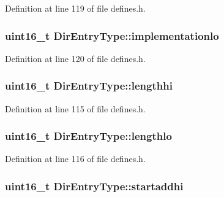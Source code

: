Definition at line 119 of file defines.\+h.

\subsubsection[{\texorpdfstring{implementationlo}{implementationlo}}]{\setlength{\rightskip}{0pt plus 5cm}uint16\+\_\+t Dir\+Entry\+Type\+::implementationlo}\hypertarget{structDirEntryType_a8164d577c06fb7c312aaa4955d491449}{}\label{structDirEntryType_a8164d577c06fb7c312aaa4955d491449}


Definition at line 120 of file defines.\+h.

\subsubsection[{\texorpdfstring{lengthhi}{lengthhi}}]{\setlength{\rightskip}{0pt plus 5cm}uint16\+\_\+t Dir\+Entry\+Type\+::lengthhi}\hypertarget{structDirEntryType_ad7aaba7b01038bc8bacb096bd66fff08}{}\label{structDirEntryType_ad7aaba7b01038bc8bacb096bd66fff08}


Definition at line 115 of file defines.\+h.

\subsubsection[{\texorpdfstring{lengthlo}{lengthlo}}]{\setlength{\rightskip}{0pt plus 5cm}uint16\+\_\+t Dir\+Entry\+Type\+::lengthlo}\hypertarget{structDirEntryType_ad1cde25a0229866557cd5983c27fbd31}{}\label{structDirEntryType_ad1cde25a0229866557cd5983c27fbd31}


Definition at line 116 of file defines.\+h.

\subsubsection[{\texorpdfstring{startaddhi}{startaddhi}}]{\setlength{\rightskip}{0pt plus 5cm}uint16\+\_\+t Dir\+Entry\+Type\+::startaddhi}\hypertarget{structDirEntryType_a0cab2915e9f864e25b24d298c36c11db}{}\label{structDirEntryType_a0cab2915e9f864e25b24d298c36c11db}


